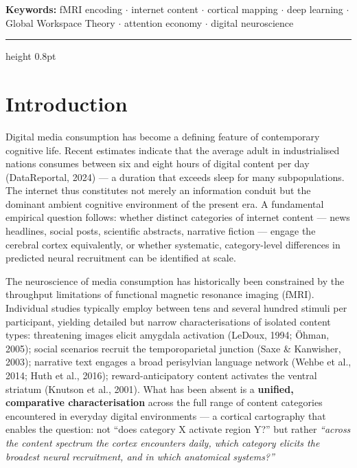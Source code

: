 \documentclass[11pt,letterpaper]{article}
\numberwithin{equation}{section}
\begin{document}
\vspace{0.4em}
\noindent\textbf{Keywords:} fMRI encoding $\cdot$ internet content $\cdot$ cortical mapping $\cdot$ deep learning $\cdot$ Global Workspace Theory $\cdot$ attention economy $\cdot$ digital neuroscience

\vspace{1.2em}
{\color{rule}\hrule height 0.8pt}
\vspace{0.8em}

\section{Introduction}

Digital media consumption has become a defining feature of contemporary cognitive life. Recent estimates indicate that the average adult in industrialised nations consumes between six and eight hours of digital content per day (DataReportal, 2024) --- a duration that exceeds sleep for many subpopulations. The internet thus constitutes not merely an information conduit but the dominant ambient cognitive environment of the present era. A fundamental empirical question follows: whether distinct categories of internet content --- news headlines, social posts, scientific abstracts, narrative fiction --- engage the cerebral cortex equivalently, or whether systematic, category-level differences in predicted neural recruitment can be identified at scale.

The neuroscience of media consumption has historically been constrained by the throughput limitations of functional magnetic resonance imaging (fMRI). Individual studies typically employ between tens and several hundred stimuli per participant, yielding detailed but narrow characterisations of isolated content types: threatening images elicit amygdala activation (LeDoux, 1994; \"{O}hman, 2005); social scenarios recruit the temporoparietal junction (Saxe \& Kanwisher, 2003); narrative text engages a broad perisylvian language network (Wehbe et al., 2014; Huth et al., 2016); reward-anticipatory content activates the ventral striatum (Knutson et al., 2001). What has been absent is a \textbf{unified, comparative characterisation} across the full range of content categories encountered in everyday digital environments --- a cortical cartography that enables the question: not ``does category X activate region Y?'' but rather \textit{``across the content spectrum the cortex encounters daily, which category elicits the broadest neural recruitment, and in which anatomical systems?''}
\end{document}
